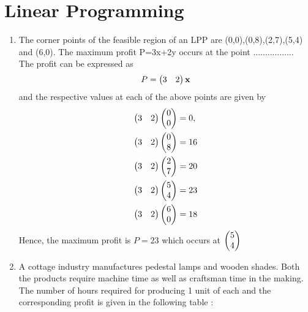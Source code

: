 \documentclass[journal,12pt,twocolumn]{IEEEtran}
\renewcommand\thesection{\arabic{section}}
\begin{document}
 \section{Linear Programming}
\begin{enumerate}[label=\thesection.\arabic*.,ref=\thesection.\theenumi]
\item  The corner points of the feasible region of an LPP are (0,0),(0,8),(2,7),(5,4) and (6,0). The maximum profit P=3x+2y occurs at the point .................\\
	\solution The profit can be expressed as
\begin{align}
	P=\begin{pmatrix}3  & 2\end{pmatrix} \mathbf{x}
    \end{align}
    and the respective values at each of the above points are given by 
\begin{align}
	\begin{pmatrix}3  & 2\end{pmatrix}\begin{pmatrix}0\\0\end{pmatrix} &= 0,
	\\
	\begin{pmatrix}3  & 2\end{pmatrix}\begin{pmatrix}0\\8\end{pmatrix} & = 16
	\\
	\begin{pmatrix}3  & 2\end{pmatrix}\begin{pmatrix}2\\7\end{pmatrix} &= 20
	\\
	\begin{pmatrix}3  & 2\end{pmatrix}\begin{pmatrix}5\\4\end{pmatrix} &= 23
	\\
	\begin{pmatrix}3  & 2\end{pmatrix} \begin{pmatrix}6\\0\end{pmatrix} &= 18 
    \end{align}
    Hence, the maximum profit is $P = 23$ which occurs at $\begin{pmatrix}5\\4\end{pmatrix}$
\item A cottage industry manufactures pedestal lamps and wooden shades. Both the products require machine time as well as craftsman time in the making. The number of hours required for producing 1 unit of each and the corresponding profit is given in the following table :
\begin{table}[htb]
\tiny
\end{table}
\end{enumerate}
\end{document}
